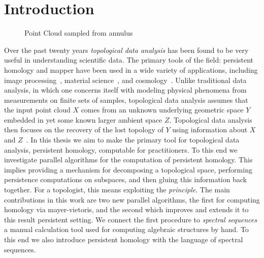 \chapter{Introduction}
\begin{figure}
\centering
{}      
 \hspace{.5cm}
 \caption{Point Cloud sampled from annulus}
 \end{figure}
Over the past twenty years \emph{topological data analysis} has been found to be very useful in understanding scientific data. The primary tools of the field: persistent homology and mapper have been used in a wide variety of applications, including image processing~\cite{cid-lbs-08}, material science~\cite{SW-measuring-shape}, and cosmology~\cite{cosmic-web}. Unlike traditional data analysis, in which one concerns itself with modeling physical phenomena from measurements on finite sets of samples, topological data analysis assumes that the input point cloud $X$ comes from an unknown underlying geometric space $Y$ embedded in yet some known larger ambient space $Z$. Topological data analysis then focuses on the recovery of the lost topology of $Y$ using information about $X$ and $Z$~\cite{c-tnd-09}. In this thesis we aim to make the primary tool for topological data analysis, persistent homology, computable for practitioners. To this end we investigate parallel algorithms for the computation of persistent homology. This implies providing a mechanism for decomposing a topological space, performing persistence computations on subspaces, and then gluing this information back together. For a topologist, this means exploiting the \emph{\mv principle}. The main contributions in this work are two new parallel algorithms, the first for computing homology via mayer-vietoris, and the second which improves and extends it to this result persistent setting. We connect the first procedure to \emph{spectral sequences} a manual calculation tool used for computing algebraic structures by hand. To this end we also introduce persistent homology with the language of spectral sequences.


